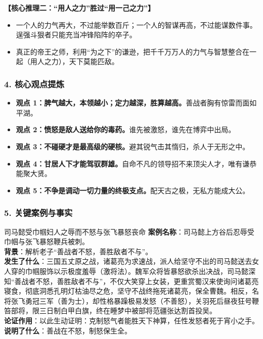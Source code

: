 \noindent\textbf{【核心推理二：“用人之力”胜过“用一己之力”】}
\begin{itemize}
    \item 一个人的力气再大，不过能举数百斤；一个人的智谋再高，不过能谋数件事。逞强斗狠者只能充当冲锋陷阵的卒子。
    \item 真正的帝王之师，利用“为之下”的谦逊，把千千万万人的力气与智慧整合在一起（用人之力），天下莫能匹敌。
\end{itemize}

\subsubsection{4. 核心观点提炼}
\begin{itemize}
    \item \textbf{观点 1：脾气越大，本领越小；定力越深，胜算越高。}善战者胸有惊雷而面如平湖。
    \item \textbf{观点 2：愤怒是敌人送给你的毒药。}谁先被激怒，谁先在博弈中出局。
    \item \textbf{观点 3：不碰硬才是最高级的硬核。}避其锐气击其惰归，杀人于无形之中。
    \item \textbf{观点 4：甘居人下才能驾驭群雄。}自命不凡的领导招不来顶尖人才，唯有谦恭能聚大贤。
    \item \textbf{观点 5：不争是调动一切力量的终极支点。}配天古之极，无私方能成大公。
\end{itemize}

\subsubsection{5. 关键案例与事实}
\begin{CaseBox}{司马懿受巾帼妇人之辱而不怒与张飞暴怒丧命}
\textbf{案例名称}：司马懿上方谷后忍辱受巾帼与张飞暴怒鞭兵被刺。\\
\textbf{背景}：解析老子“善战者不怒，善胜敌者不与”。\\
\textbf{发生了什么}：三国五丈原之战，诸葛亮为求速战，派人给坚守不出的司马懿送去女人穿的巾帼服饰以示极度羞辱（激将法）。魏军众将皆暴怒欲杀出决战，司马懿深知“善战者不怒，善胜敌者不与”，不仅大笑穿上女装，更重赏蜀汉来使询问诸葛亮寝食，彻底洞悉孔明灯枯油尽之危，坚守不战终拖死诸葛亮，保全曹魏。相反，名将张飞勇冠三军（善为士），却性格暴躁极易发怒（不善怒），关羽死后昼夜狂号鞭笞部将，限三日制白甲白旗，终在睡梦中被部将范疆张达割首投吴。\\
\textbf{论证作用}：以此生动证明：克制怒气者能胜天下神算，任性发怒者死于宵小之手。\\
\textbf{说明了什么}：善战在不怒，制怒保生全。
\end{CaseBox}

